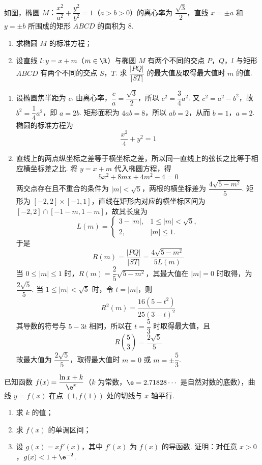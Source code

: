 \begin{problem}
如图，椭圆 \(M\)：\(\dfrac{x^2}{a^2}+\dfrac{y^2}{b^2}=1\)（\(a>b>0\)）的离心率为 \(\dfrac{\sqrt3}{2}\)，直线 \(x=\pm a\) 和 \(y=\pm b\) 所围成的矩形 \(ABCD\) 的面积为 8.
\begin{enumerate}
\item 求椭圆 \(M\) 的标准方程；
\item 设直线 \(l:y=x+m\)（\(m\in\R\)）与椭圆 \(M\) 有两个不同的交点 \(P\)，\(Q\)，\(l\) 与矩形 \(ABCD\) 有两个不同的交点 \(S\)，\(T\). 求 \(\dfrac{|PQ|}{|ST|}\) 的最大值及取得最大值时 \(m\) 的值.
\end{enumerate}
\end{problem}

\begin{solution}
\begin{enumerate}
\item 设椭圆焦半距为 \(c\). 由离心率，\(\dfrac ca=\dfrac{\sqrt3}{2}\)，所以 \(c^2=\dfrac34a^2\). 又 \(c^2=a^2-b^2\)，故 \(b^2=\dfrac14a^2\)，即 \(a=2b\). 矩形面积为 \(4ab=8\)，所以 \(ab=2\)，从而 \(b=1\)，\(a=2\). 椭圆的标准方程为
\[
\frac{x^2}{4}+y^2=1
\]
\item 直线上的两点纵坐标之差等于横坐标之差，所以同一直线上的弦长之比等于相应横坐标差之比. 将 \(y=x+m\) 代入椭圆方程，得
\[
5x^2+8mx+4m^2-4=0
\]
两交点存在且不重合的条件为 \(|m|<\sqrt5\)，两根的横坐标差为 \(\dfrac{4\sqrt{5-m^2}}5\). 矩形为 \([-2,2]\times[-1,1]\)，直线在矩形内对应的横坐标区间为 \([-2,2]\cap[-1-m,1-m]\)，故其长度为
\[
L(m)=
\begin{cases}
3-|m|,&1\leqslant|m|<\sqrt5,\\
2,&|m|\leqslant1.
\end{cases}
\]
于是
\[
R(m)=\frac{|PQ|}{|ST|}=\frac{4\sqrt{5-m^2}}{5L(m)}
\]
当 \(0\leqslant |m|\leqslant1\) 时，\(R(m)=\dfrac25\sqrt{5-m^2}\)，其最大值在 \(|m|=0\) 时取得，为 \(\dfrac{2\sqrt5}{5}\). 当 \(1\leqslant |m|<\sqrt5\) 时，令 \(t=|m|\)，则
\[
R^2(m)=\frac{16(5-t^2)}{25(3-t)^2}
\]
其导数的符号与 \(5-3t\) 相同，所以在 \(t=\dfrac53\) 时取得最大值，且
\[
R\left(\frac53\right)=\frac{2\sqrt5}{5}
\]
故最大值为 \(\dfrac{2\sqrt5}{5}\)，取得最大值时 \(m=0\) 或 \(m=\pm\dfrac53\).
\end{enumerate}
\end{solution}

\begin{problem}
已知函数 \(f(x)=\dfrac{\ln x+k}{\e^x}\)（\(k\) 为常数，\(\e=2.71828\cdots\) 是自然对数的底数），曲线 \(y=f(x)\) 在点 \((1,f(1))\) 处的切线与 \(x\) 轴平行.
\begin{enumerate}
\item 求 \(k\) 的值；
\item 求 \(f(x)\) 的单调区间；
\item 设 \(g(x)=xf'(x)\)，其中 \(f'(x)\) 为 \(f(x)\) 的导函数. 证明：对任意 \(x>0\)，\(g(x)<1+\e^{-2}\).
\end{enumerate}
\end{problem}

